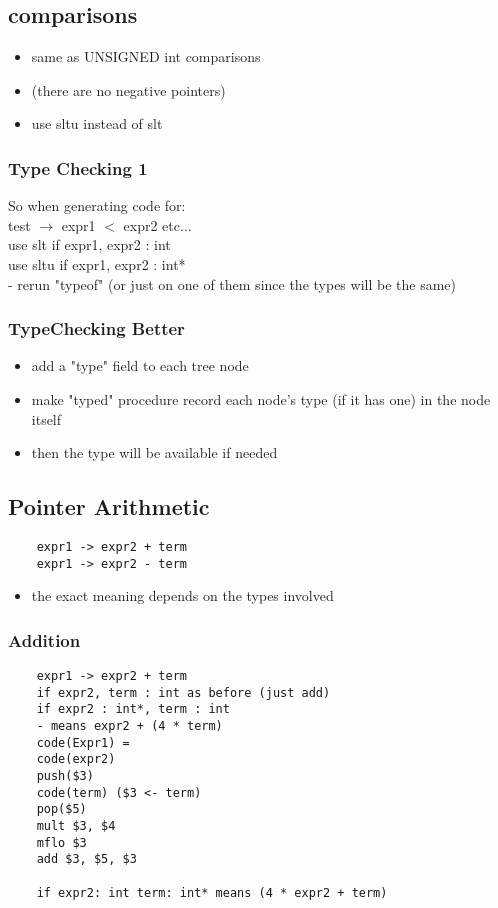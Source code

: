 \documentclass[12pt]{article}
\begin{document}
	\subsection*{comparisons}
	\begin{itemize}
		\item same as UNSIGNED int comparisons
		\item (there are no negative pointers)
		\item use sltu instead of slt
	\end{itemize}
	\subsubsection*{Type Checking 1}
	So when generating code for:\\
	test $\rightarrow$ expr1 $<$ expr2 etc...\\
	use slt if expr1, expr2 : int\\
	use sltu if expr1, expr2 : int*\\
	- rerun "typeof" (or just on one of them since the types will be the same)\\
	
	\subsubsection*{TypeChecking Better}
	\begin{itemize}
		\item add a "type" field to each tree node
		\item make "typed" procedure record each node's type (if it has one) in the node itself
		\item then the type will be available if needed
	\end{itemize}
	
	\subsection*{Pointer Arithmetic}
	\begin{verbatim}
	expr1 -> expr2 + term
	expr1 -> expr2 - term
	\end{verbatim}
	
	\begin{itemize}
		\item the exact meaning depends on the types involved
	\end{itemize}
	
	\subsubsection*{Addition}
	\begin{verbatim}
	expr1 -> expr2 + term
	if expr2, term : int as before (just add)
	if expr2 : int*, term : int
	- means expr2 + (4 * term)
	code(Expr1) =
	code(expr2)
	push($3)
	code(term) ($3 <- term)
	pop($5)
	mult $3, $4
	mflo $3
	add $3, $5, $3
	
	if expr2: int term: int* means (4 * expr2 + term)
	\end{verbatim}
	
\end{document}
